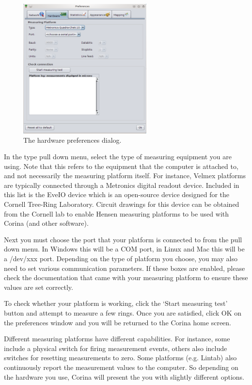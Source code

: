 \begin{figure}[hbtp]
  \centering
    \includegraphics[width=0.6\textwidth]{Images/hardwareprefs.png}
    \caption{The hardware preferences dialog.}
    \label{fig:hardwareprefs}
\end{figure}

In the type pull down menu, select the type of measuring equipment you are using. Note that this refers to the equipment that the computer is attached to, and not necessarily the measuring platform itself. For instance, Velmex platforms are typically connected through a Metronics digital readout device. Included in this list is the EveIO device which is an open-source device designed for the Cornell Tree-Ring Laboratory. Circuit drawings for this device can be obtained from the Cornell lab to enable Hensen measuring platforms to be used with Corina (and other software).

Next you must choose the port that your platform is connected to from the pull down menu. In Windows this will be a COM port, in Linux and Mac this will be a /dev/xxx port.  Depending on the type of platform you choose, you may also need to set various communication parameters.  If these boxes are enabled, please check the documentation that came with your measuring platform to ensure these values are set correctly.

To check whether your platform is working, click the `Start measuring test' button and attempt to measure a few rings.  Once you are satisfied, click OK on the preferences window and you will be returned to the Corina home screen.

Different measuring platforms have different capabilities.  For instance, some include a physical switch for firing measurement events, others also include switches for resetting measurements to zero.  Some platforms (e.g. Lintab) also continuously report the measurement values to the computer.  So depending on the hardware you use, Corina will present the you with slightly different options.  

